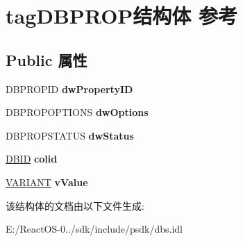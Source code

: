 \hypertarget{structtag_d_b_p_r_o_p}{}\section{tag\+D\+B\+P\+R\+O\+P结构体 参考}
\label{structtag_d_b_p_r_o_p}
\subsection*{Public 属性}
\begin{DoxyCompactItemize}
\item 
\mbox{\label{structtag_d_b_p_r_o_p_a9a5482b301d42c438b9c0c9c528c82c4}} 
D\+B\+P\+R\+O\+P\+ID {\bfseries dw\+Property\+ID}
\item 
\mbox{\label{structtag_d_b_p_r_o_p_ac230cf638bdf799b8d203bda96b88602}} 
D\+B\+P\+R\+O\+P\+O\+P\+T\+I\+O\+NS {\bfseries dw\+Options}
\item 
\mbox{\label{structtag_d_b_p_r_o_p_a7cd55b6dcb51b25091ac83820a805f33}} 
D\+B\+P\+R\+O\+P\+S\+T\+A\+T\+US {\bfseries dw\+Status}
\item 
\mbox{\label{structtag_d_b_p_r_o_p_a7bab4563f848551fd0fa32a358759742}} 
\hyperlink{structtag_d_b_i_d}{D\+B\+ID} {\bfseries colid}
\item 
\mbox{\label{structtag_d_b_p_r_o_p_afb3e176249d62fb15108edafb3704abf}} 
\hyperlink{structtag_v_a_r_i_a_n_t}{V\+A\+R\+I\+A\+NT} {\bfseries v\+Value}
\end{DoxyCompactItemize}


该结构体的文档由以下文件生成\+:\begin{DoxyCompactItemize}
\item 
E\+:/\+React\+O\+S-\/0../sdk/include/psdk/dbs.\+idl\end{DoxyCompactItemize}
